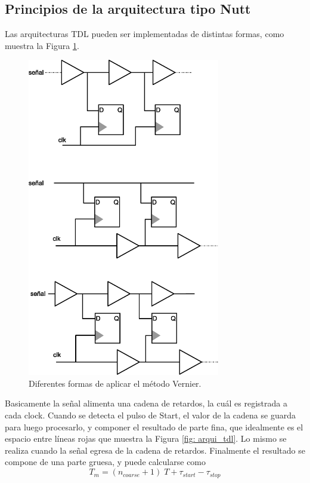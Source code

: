 \subsection{Principios de la arquitectura tipo Nutt}
Las arquitecturas TDL pueden ser implementadas de distintas formas, como muestra la Figura \ref{fig: various_tdl}.
\begin{figure}[H]
     \centering
     \includegraphics[width=0.75\textwidth]{imagenes/various_tdl.eps}
     \caption{Diferentes formas de aplicar el método Vernier.}
     \label{fig: various_tdl}
\end{figure}

Basicamente la señal alimenta una cadena de retardos, la cuál es registrada a cada clock. Cuando
se detecta el pulso de Start, el valor de la cadena se guarda para luego procesarlo, y componer el
resultado de parte fina, que idealmente es el espacio entre líneas rojas que muestra la Figura \ref{fig: arqui_tdl}. 
Lo mismo se realiza cuando la señal egresa de la cadena de retardos. Finalmente el resultado se compone
de una parte gruesa, y puede calcularse como
\begin{equation*}
     T_{m} = (n_{coarse}+1) \; T + \tau_{start} - \tau_{stop} 
\end{equation*}

